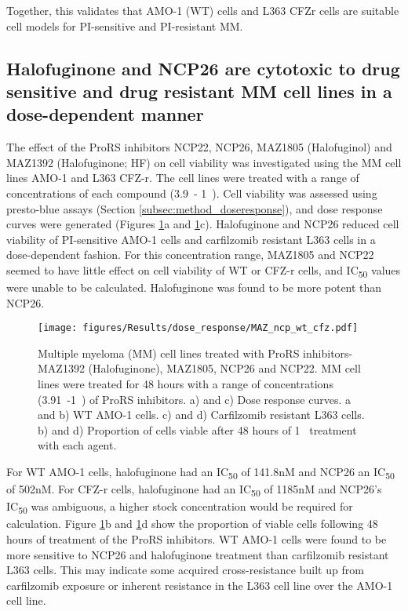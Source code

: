 Together, this validates that AMO-1 (WT) cells and L363 CFZr cells are suitable cell models for PI-sensitive and PI-resistant MM\@.

\subsection{Halofuginone and NCP26 are cytotoxic to drug sensitive and drug resistant MM cell lines in a dose-dependent manner}\label{subsec:pro_cell_viability}
The effect of the ProRS inhibitors NCP22, NCP26, MAZ1805 (Halofuginol) and MAZ1392 (Halofuginone; HF) on cell viability was investigated using the MM cell lines AMO-1 and L363 CFZ-r.
The cell lines were treated with a range of concentrations of each compound (3.9\si{\nano\Molar}- 1\si{\micro\Molar}).
Cell viability was assessed using presto-blue assays (Section \ref{subsec:method_doseresponse}), and dose response curves were generated (Figures \ref{fig:dose}a and \ref{fig:dose}c).
Halofuginone and NCP26 reduced cell viability of PI-sensitive AMO-1 cells and carfilzomib resistant L363 cells in a dose-dependent fashion.
For this concentration range, MAZ1805 and NCP22 seemed to have little effect on cell viability of WT or CFZ-r cells, and IC\textsubscript{50} values were unable to be calculated.
Halofuginone was found to be more potent than NCP26.
%
\begin{figure}[h]
\centering
\texttt{[image: figures/Results/dose\_response/MAZ\_ncp\_wt\_cfz.pdf]}
\caption[ProRS inhibitor dose response curves]{Multiple myeloma (MM) cell lines treated with ProRS inhibitors- MAZ1392 (Halofuginone), MAZ1805, NCP26 and NCP22.
MM cell lines were treated for 48 hours with a range of concentrations (3.91\si{\nano\Molar}-1\si{\micro\Molar}) of ProRS inhibitors.
a) and c) Dose response curves.
a and b) WT AMO-1 cells.
c) and d) Carfilzomib resistant L363 cells.
b) and d) Proportion of cells viable after 48 hours of 1\si{\micro\Molar} treatment with each agent.}
\label{fig:dose}
\end{figure}

For WT AMO-1 cells, halofuginone had an IC\textsubscript{50} of 141.8nM and NCP26 an IC\textsubscript{50} of 502nM. For CFZ-r cells, halofuginone had an IC\textsubscript{50} of 1185nM and NCP26's IC\textsubscript{50} was ambiguous, a higher stock concentration would be required for calculation.
Figure \ref{fig:dose}b and \ref{fig:dose}d show the proportion of viable cells following 48 hours of treatment of the ProRS inhibitors.
WT AMO-1 cells were found to be more sensitive to NCP26 and halofuginone treatment than carfilzomib resistant L363 cells.
This may indicate some acquired cross-resistance built up from carfilzomib exposure or inherent resistance in the L363 cell line over the AMO-1 cell line.


